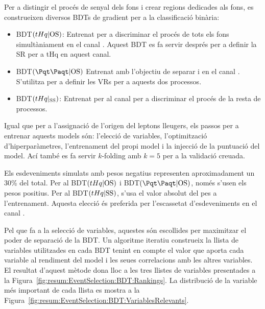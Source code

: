 Per a distingir el procés de senyal \tHq dels fons i crear regions dedicades als fons,
es construeixen diversos BDTs de gradient per a la classificació binària:
\begin{itemize}
	\item BDT$(tHq|{\text{OS}})$: Entrenat per a discriminar el procés \tHq de tots els fons simultàniament
		en el canal \dilepOStau. Aquest BDT es fa servir després per a definir la SR per a tHq en aquest canal.
	\item BDT$(\ttbar|{\text{OS}})$ Entrenat amb l'objectiu de separar \ttbar i \Zjets en el canal \dilepOStau. 
		S'utilitza per a definir les VRs per a aquests dos processos.
	\item BDT$(tHq|_{\text{SS}})$: Entrenat per al canal \dilepSStau per a discriminar el procés \tHq de la resta 
		de processos.
\end{itemize}

Igual que per a l'assignació de l'origen del leptons lleugers, els passos per a entrenar 
aquests models són: l'elecció de variables, l'optimització d'hiperparàmetres, l'entrenament 
del propi model i la injecció de la puntuació del model. Ací també es fa servir $k$-folding amb
$k=5$ per a la validació creuada.

Els esdeveniments simulats amb pesos negatius representen aproximadament un 30\% del total.
Per al BDT$(tHq|{\text{OS}})$ i BDT$(\ttbar|{\text{OS}})$, només s'usen els pesos positius.
Per al BDT$(tHq|{\text{SS}})$, s'usa el valor absolut del pes a l'entrenament.
Aquesta elecció és preferida per l'escassetat d'esdeveniments en el canal \dilepSStau.

Pel que fa a la selecció de variables, aquestes són escollides per maximitzar el poder
de separació de la BDT. Un algoritme iteratiu construeix la llista de variables utilitzades
en cada BDT tenint en compte el valor que aporta cada variable al rendiment del model
i les seues correlacions amb les altres variables. El resultat d'aquest mètode dona lloc
a les tres llistes de variables presentades a la Figura~\ref{fig:resum:EventSelection:BDT:Rankings}.
La distribució de la variable més important de cada llista es mostra a la Figura~\ref{fig:resum:EventSelection:BDT:VariablesRelevants}.

